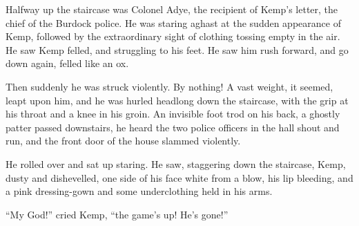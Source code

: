 Halfway up the staircase was Colonel Adye, the recipient of Kemp’s letter, the chief of the Burdock police. He was staring aghast at the sudden appearance of Kemp, followed by the extraordinary sight of clothing tossing empty in the air. He saw Kemp felled, and struggling to his feet. He saw him rush forward, and go down again, felled like an ox.

Then suddenly he was struck violently. By nothing! A vast weight, it seemed, leapt upon him, and he was hurled headlong down the staircase, with the grip at his throat and a knee in his groin. An invisible foot trod on his back, a ghostly patter passed downstairs, he heard the two police officers in the hall shout and run, and the front door of the house slammed violently.

He rolled over and sat up staring. He saw, staggering down the staircase, Kemp, dusty and dishevelled, one side of his face white from a blow, his lip bleeding, and a pink dressing-gown and some underclothing held in his arms.

“My God!” cried Kemp, “the game’s up! He’s gone!”